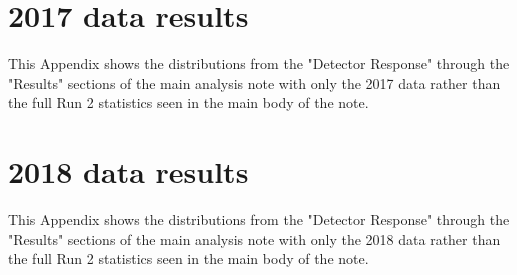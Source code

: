 










\section{2017 data results}

This Appendix shows the distributions from the "Detector Response" through the "Results" sections of the main analysis note with only the 2017 data rather than the full Run 2 statistics seen in the main body of the note.









%


%





















\section{2018 data results}

This Appendix shows the distributions from the "Detector Response" through the "Results" sections of the main analysis note with only the 2018 data rather than the full Run 2 statistics seen in the main body of the note.







